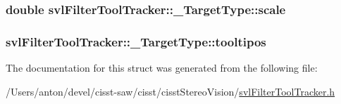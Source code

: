 \subsubsection[{scale}]{\setlength{\rightskip}{0pt plus 5cm}double svl\+Filter\+Tool\+Tracker\+::\+\_\+\+Target\+Type\+::scale}\label{structsvl_filter_tool_tracker_1_1___target_type_a41580992baafb3f771b25c8c7d133477}
\hypertarget{structsvl_filter_tool_tracker_1_1___target_type_a66b5c46a3d281d97a8394b62afce58d1}{}
\subsubsection[{tooltipos}]{ svl\+Filter\+Tool\+Tracker\+::\+\_\+\+Target\+Type\+::tooltipos}\label{structsvl_filter_tool_tracker_1_1___target_type_a66b5c46a3d281d97a8394b62afce58d1}


The documentation for this struct was generated from the following file\+:\begin{DoxyCompactItemize}
\item 
/\+Users/anton/devel/cisst-\/saw/cisst/cisst\+Stereo\+Vision/\hyperlink{svl_filter_tool_tracker_8h}{svl\+Filter\+Tool\+Tracker.\+h}\end{DoxyCompactItemize}
